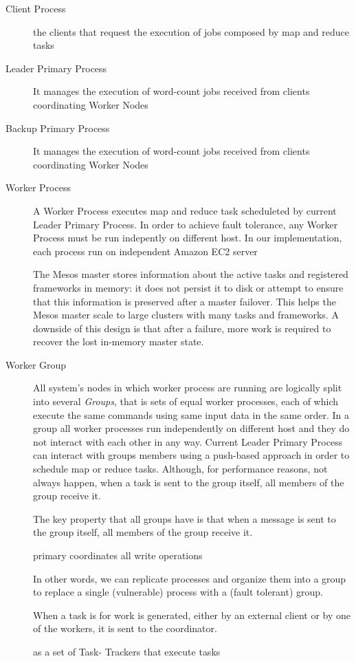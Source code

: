 \documentclass[sigchi]{acmart}
\begin{document}
\begin{description}
\item[Client Process] the clients that request the execution of jobs composed by map and reduce tasks

\item[Leader Primary Process] It manages the execution of word-count jobs received from clients coordinating Worker Nodes 

\item[Backup Primary Process] It manages the execution of word-count jobs received from clients coordinating Worker Nodes 

\item[Worker Process] A Worker Process executes map and reduce task scheduleted by current Leader Primary Process. In order to achieve fault tolerance, any Worker Process must be run indepently on different host. In our implementation, each process run on independent Amazon EC2 server

The Mesos master stores information about the active tasks and registered frameworks in memory: it does not persist it to disk or attempt to ensure that this information is preserved after a master failover. This helps the Mesos master scale to large clusters with many tasks and frameworks. A downside of this design is that after a failure, more work is required to recover the lost in-memory master state.



\item[Worker Group] All system's nodes in which worker process are running are logically split into several \textit{Groups}, that is sets of equal worker processes, each of which execute the same commands using same input data in the same order. In a group all worker processes run independently on different host and they do not interact with each other in any way. Current Leader Primary Process can interact with groups members using a push-based approach in order to schedule map or reduce tasks. Although, for performance reasons, not always happen, when a task is sent to the group itself, all members of the group receive it.



The key property that all groups have is that when a
message is sent to the group itself, all members of the group receive it.


 primary coordinates all write
operations


 In other words, we can replicate processes and organize them into a group to replace a single (vulnerable) process with a (fault tolerant) group.



 When a task is  for work is generated, either
by an external client or by one of the workers, it is sent to the coordinator.





as  a set of Task- Trackers that execute tasks
\end{description}
\end{document}
